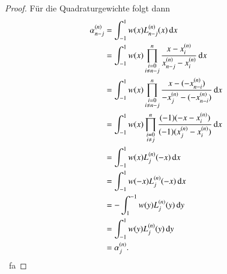 \begin{proof}
  Für die Quadraturgewichte folgt dann
  \begin{equation*}
    \begin{split}
      \alpha_{n-j}^{(n)}
      &= \int_{-1}^1{w(x)L_{n-j}^{(n)}(x) \dif x} \\
      &= \int_{-1}^1{w(x)\prod_{\substack{i=0 \\ i \neq n-j}}^n{\frac{x-x_i^{(n)}}{x_{n-j}^{(n)}-x_i^{(n)}}} \dif x} \\
      &= \int_{-1}^1{w(x)\prod_{\substack{i=0 \\ i \neq n-j}}^n{\frac{x-(-x_{n-i}^{(n)})}{-x_j^{(n)}-(-x_{n-i}^{(n)})}} \dif x} \\
      &= \int_{-1}^1{w(x)\prod_{\substack{i=0 \\ i \neq j}}^n{\frac{(-1)(-x - x_i^{(n)})}{(-1)(x_j^{(n)}-x_i^{(n)})}} \dif x} \\
      &= \int_{-1}^1{w(x)L_j^{(n)}(-x) \dif x} \\
      &= \int_{-1}^1{w(-x)L_j^{(n)}(-x) \dif x} \\
      &= -\int_1^{-1}{w(y)L_j^{(n)}(y) \dif y} \\
      &= \int_{-1}^1{w(y)L_j^{(n)}(y) \dif y} \\
      &= \alpha_j^{(n)}.
    \end{split}
  \end{equation*}
  \qedhere \ fa
\end{proof}
